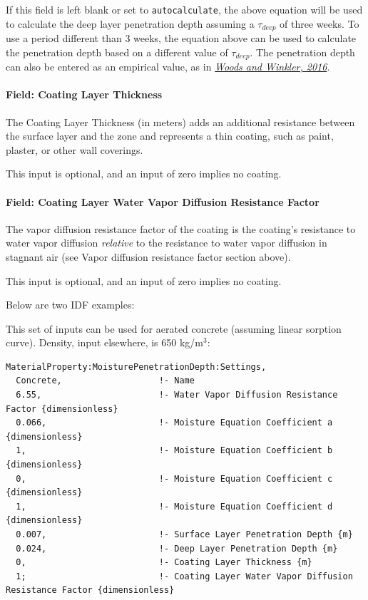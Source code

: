 If this field is left blank or set to \texttt{autocalculate}, the above equation will be used to calculate the deep layer penetration depth assuming a $\tau_{deep}$ of three weeks. To use a period different than 3 weeks, the equation above can be used to calculate the penetration depth based on a different value of $\tau_{deep}$. The penetration depth can also be entered as an empirical value, as in \href{http://dx.doi.org/10.1016/j.enbuild.2016.02.008}{\emph{Woods and Winkler, 2016}}.

\paragraph{Field: Coating Layer	Thickness}\label{field-coating-layer-thickness}

The Coating Layer Thickness (in meters) adds an additional resistance between the surface layer and the zone and represents a thin coating, such as paint, plaster, or other wall coverings.

This input is optional, and an input of zero implies no coating.

\paragraph{Field: Coating Layer Water Vapor Diffusion Resistance Factor}\label{field-coating-layer-water-vapor-diffusion-resistance-factor}

The vapor diffusion resistance factor of the coating is the coating's resistance to water vapor diffusion \emph{relative} to the resistance to water vapor diffusion in stagnant air (see Vapor diffusion resistance factor section above).

This input is optional, and an input of zero implies no coating.

Below are two IDF examples:

This set of inputs can be used for aerated concrete (assuming linear sorption curve). Density, input elsewhere, is 650 kg/m$^3$:

\begin{lstlisting}
MaterialProperty:MoisturePenetrationDepth:Settings,
  Concrete,                   !- Name
  6.55,                       !- Water Vapor Diffusion Resistance Factor {dimensionless}
  0.066,                      !- Moisture Equation Coefficient a {dimensionless}
  1,                          !- Moisture Equation Coefficient b {dimensionless}
  0,                          !- Moisture Equation Coefficient c {dimensionless}
  1,                          !- Moisture Equation Coefficient d {dimensionless}
  0.007,                      !- Surface Layer Penetration Depth {m}
  0.024,                      !- Deep Layer Penetration Depth {m}
  0,                          !- Coating Layer Thickness {m}
  1;                          !- Coating Layer Water Vapor Diffusion Resistance Factor {dimensionless}
\end{lstlisting}

